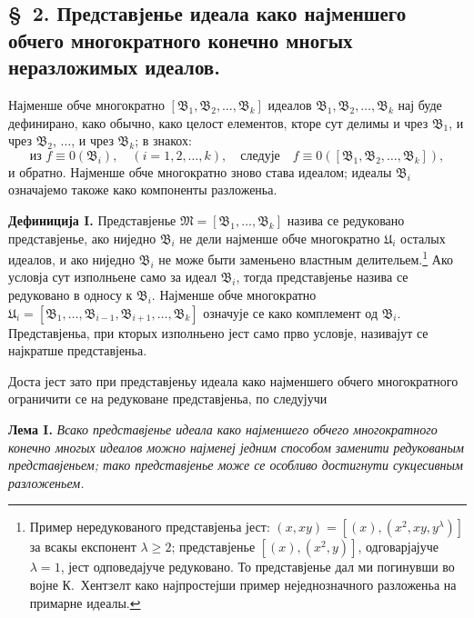 ﻿\documentclass[11pt]{article}
\newcommand{\ideal}[1]{\mathfrak{#1}}
\begin{document}

\setcounter{footnote}{8}
\subsection*{\S~2. Представјенье идеала како најменшего обчего многократного конечно многых неразложимых идеалов.}

Најменше обче многократно \([\ideal B_1,\ideal B_2,\ldots,\ideal B_k]\) идеалов \(\ideal B_1,\ideal B_2,\ldots,\ideal B_k\) нај буде дефинирано, како обычно, како целост елементов, кторе сут делимы и чрез \(\ideal B_1\), и чрез \(\ideal B_2\), \(\ldots\), и чрез \(\ideal B_k\); в знакох:
\[
 \text{из } f\equiv0(\ideal B_i),\quad (i=1,2,\ldots,k),
 \quad\text{следује}\quad
 f\equiv0([\ideal B_1,\ideal B_2,\ldots,\ideal B_k]),
\]
и обратно. Најменше обче многократно зново става идеалом; идеалы \(\ideal B_i\) означајемо такоже како компоненты разложеньа.

\textbf{Дефиниција I.} Представјенье \(\ideal M=[\ideal B_1,\ldots,\ideal B_k]\) назива се редуковано представјенье, ако ниједно \(\ideal B_i\) не дели најменше обче многократно \(\ideal U_i\) осталых идеалов, и ако ниједно \(\ideal B_i\) не може быти заменьено властным делительем.\footnote{Пример нередукованого представјеньа јест: \((x,xy)=[(x),(x^2,xy,y^\lambda)]\) за всакы експонент \(\lambda\ge2\); представјенье \([(x),(x^2,y)]\), одговарјајуче \(\lambda=1\), јест одповедајуче редуковано. То представјенье дал ми погинувши во војне К.~Хентзелт како најпростејши пример неједнозначного разложеньа на примарне идеалы.} Ако условја сут изполньене само за идеал \(\ideal B_i\), тогда представјенье назива се редуковано в односу к \(\ideal B_i\). Најменше обче многократно \(\ideal U_i=[\ideal B_1,\ldots,\ideal B_{i-1},\ideal B_{i+1},\ldots,\ideal B_k]\) означује се како комплемент од \(\ideal B_i\). Представјеньа, при кторых изполньено јест само прво условје, називајут се најкратше представјеньа.

Доста јест зато при представјеньу идеала како најменшего обчего многократного ограничити се на редуковане представјеньа, по следујучи

\textbf{Лема I.} \emph{Всако представјенье идеала како најменшего обчего многократного конечно многых идеалов можно најменеј једним способом заменити редукованым представјеньем; тако представјенье може се особливо достигнути сукцесивным разложеньем.}
\end{document}
